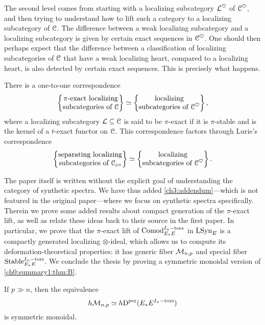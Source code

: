 The second level comes from starting with a localizing subcategory $\mathcal{L}^\heartsuit$ of $\EuScript{C}^\heartsuit$, and then trying to understand how to lift such a category to a localizing subcategory of $\EuScript{C}$. The difference between a weak localizing subcategory and a localizing subcategory is given by certain exact sequences in $\EuScript{C}^\heartsuit$. One should then perhaps expect that the difference between a classification of localizing subcategories of $\EuScript{C}$ that have a weak localizing heart, compared to a localizing heart, is also detected by certain exact sequences. This is precisely what happens.

\begin{theorem}
    There is a one-to-one correspondence
    \[\left\{ \begin{matrix} \pi\text{-exact localizing}\\ \text{subcategories of }\EuScript{C} \end{matrix} \right\} \simeq \left\{ \begin{matrix} \text{localizing}\\ \text{subcategories of }\EuScript{C}^\heartsuit \end{matrix} \right\},\]
    where a localizing subcategory $\mathcal{L}\subseteq \EuScript{C}$ is said to be $\pi$-exact if it is $\pi$-stable and is the kernel of a $t$-exact functor on $\EuScript{C}$. This correspondence factors through Lurie's correspondence
    \[\left\{ \begin{matrix} \text{separating localizing}\\ \text{subcategories of }\EuScript{C}_{\hspace{-1pt}\scriptscriptstyle\geqslant 0} \end{matrix} \right\} \simeq \left\{ \begin{matrix} \text{localizing}\\ \text{subcategories of }\EuScript{C}^\heartsuit \end{matrix} \right\}.\]
\end{theorem}

The paper itself is written without the explicit goal of understanding the category of synthetic spectra. We have thus added \cref{ch3:addendum}---which is not featured in the original paper---where we focus on synthetic spectra specifically. Therein we prove some added results about compact generation of the $\pi$-exact lift, as well as relate these ideas back to their source in the first paper. In particular, we prove that the $\pi$-exact lift of $\mathrm{Comod}_{E_*E}^{I_n-\mathrm{tors}}$ in $\mathrm{LSyn}_{E}$ is a compactly generated localizing $\otimes$-ideal, which allows us to compute its deformation-theoretical properties: it has generic fiber $\mathcal{M}_{n,p}$ and special fiber $\mathrm{Stable}_{E_*E}^{I_n-\mathrm{tors}}$. We conclude the thesis by proving a symmetric monoidal version of \cref{ch0:summary1:thm:B}. 

\begin{theorem}
    If $p\gg n$, then the equivalence
    \[h\mathcal{M}_{n,p} \simeq h \mathrm{D}^{\mathrm{per}}(E_*E^{I_n-\mathrm{tors}})\] 
    is symmetric monoidal. 
\end{theorem}
